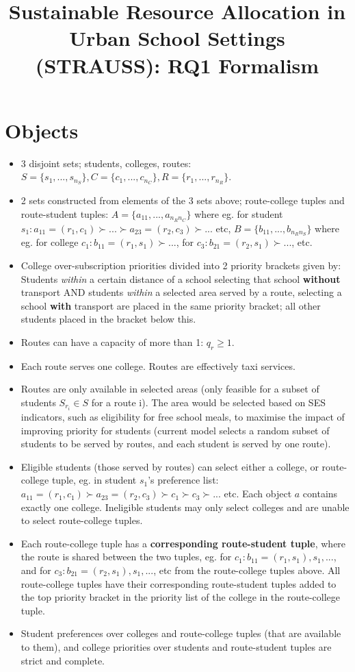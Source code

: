 \documentclass{article}
\title{Sustainable Resource Allocation in Urban School Settings (STRAUSS): RQ1 Formalism}
\begin{document}
\maketitle

\section{Objects}
\begin{itemize}
    \item 3 disjoint sets; students, colleges, routes:
    \subitem $S = \{s_1,...,s_{n_S}\}, C = \{c_1,...,c_{n_C}\}, R = \{r_1,...,r_{n_R}\}$.
    \item 2 sets constructed from elements of the 3 sets above; route-college tuples and route-student tuples:
    \subitem $A = \{a_{11},...,a_{n_R n_C}\}$ where eg. for student $s_1: a_{11} = (r_1,c_1) \succ ... \succ a_{23} = (r_2,c_3) \succ ...$ etc,
    \subitem $B = \{b_{11},...,b_{n_R n_S}\}$ where eg. for college $c_1: b_{11} = (r_1,s_1) \succ ...$, for $c_3: b_{21} = (r_2,s_1) \succ ...$, etc.
    \item College over-subscription priorities divided into 2 priority brackets given by:
    \subitem Students \textit{within} a certain distance of a school selecting that school \textbf{without} transport AND students \textit{within} a selected area served by a route, selecting a school \textbf{with} transport are placed in the same priority bracket; all other students placed in the bracket below this.
    \item Routes can have a capacity of more than 1: $q_r \geq 1$.
    \item Each route serves one college. Routes are effectively taxi services.
    \item Routes are only available in selected areas (only feasible for a subset of students $S_{r_i} \in S$ for a route i). The area would be selected based on SES indicators, such as eligibility for free school meals, to maximise the impact of improving priority for students (current model selects a random subset of students to be served by routes, and each student is served by one route).
    \item Eligible students (those served by routes) can select either a college, or route-college tuple, eg. in student $s_1$'s preference list: $a_{11} = (r_1,c_1) \succ a_{23} = (r_2,c_3) \succ c_1 \succ c_3 \succ ...$ etc. Each object $a$ contains exactly one college. Ineligible students may only select colleges and are unable to select route-college tuples.
    \item Each route-college tuple has a \textbf{corresponding route-student tuple}, where the route is shared between the two tuples, eg. for $c_1: b_{11} = (r_1,s_1), s_1, ...$, and for $c_3: b_{21} = (r_2,s_1), s_1, ...$, etc from the route-college tuples above. All route-college tuples have their corresponding route-student tuples added to the top priority bracket in the priority list of the college in the route-college tuple.
    \item Student preferences over colleges and route-college tuples (that are available to them), and college priorities over students and route-student tuples are strict and complete.
\end{itemize}
\end{document}
